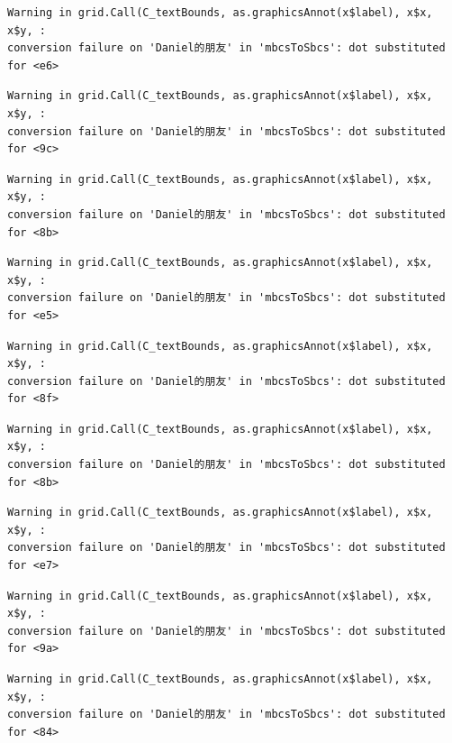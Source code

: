 \documentclass[
  letterpaper,
  DIV=11,
  numbers=noendperiod]{scrreprt}
\begin{document}
\begin{verbatim}
Warning in grid.Call(C_textBounds, as.graphicsAnnot(x$label), x$x, x$y, :
conversion failure on 'Daniel的朋友' in 'mbcsToSbcs': dot substituted for <e6>
\end{verbatim}

\begin{verbatim}
Warning in grid.Call(C_textBounds, as.graphicsAnnot(x$label), x$x, x$y, :
conversion failure on 'Daniel的朋友' in 'mbcsToSbcs': dot substituted for <9c>
\end{verbatim}

\begin{verbatim}
Warning in grid.Call(C_textBounds, as.graphicsAnnot(x$label), x$x, x$y, :
conversion failure on 'Daniel的朋友' in 'mbcsToSbcs': dot substituted for <8b>
\end{verbatim}

\begin{verbatim}
Warning in grid.Call(C_textBounds, as.graphicsAnnot(x$label), x$x, x$y, :
conversion failure on 'Daniel的朋友' in 'mbcsToSbcs': dot substituted for <e5>
\end{verbatim}

\begin{verbatim}
Warning in grid.Call(C_textBounds, as.graphicsAnnot(x$label), x$x, x$y, :
conversion failure on 'Daniel的朋友' in 'mbcsToSbcs': dot substituted for <8f>
\end{verbatim}

\begin{verbatim}
Warning in grid.Call(C_textBounds, as.graphicsAnnot(x$label), x$x, x$y, :
conversion failure on 'Daniel的朋友' in 'mbcsToSbcs': dot substituted for <8b>
\end{verbatim}

\begin{verbatim}
Warning in grid.Call(C_textBounds, as.graphicsAnnot(x$label), x$x, x$y, :
conversion failure on 'Daniel的朋友' in 'mbcsToSbcs': dot substituted for <e7>
\end{verbatim}

\begin{verbatim}
Warning in grid.Call(C_textBounds, as.graphicsAnnot(x$label), x$x, x$y, :
conversion failure on 'Daniel的朋友' in 'mbcsToSbcs': dot substituted for <9a>
\end{verbatim}

\begin{verbatim}
Warning in grid.Call(C_textBounds, as.graphicsAnnot(x$label), x$x, x$y, :
conversion failure on 'Daniel的朋友' in 'mbcsToSbcs': dot substituted for <84>
\end{verbatim}
\end{document}

